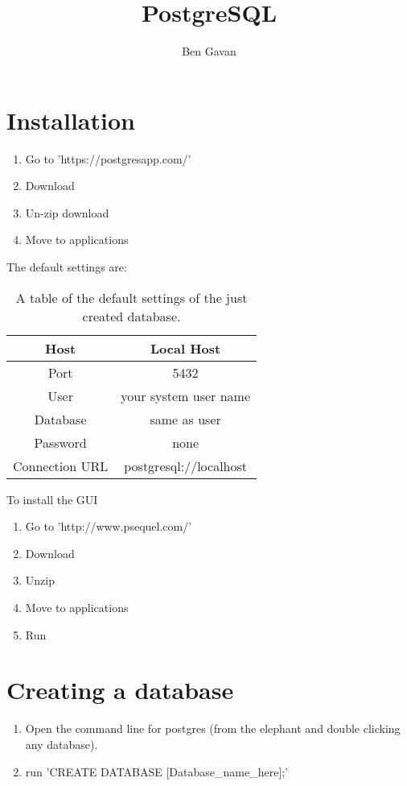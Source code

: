 \documentclass[]{article}
\title{PostgreSQL}
\author{Ben Gavan}
\begin{document}
\maketitle

\begin{abstract}

\end{abstract}

\tableofcontents

\section{Installation}
\begin{enumerate}
	\item Go to 'https://postgresapp.com/'
	\item Download
	\item Un-zip download 
	\item Move to applications
\end{enumerate}
The default settings are:
	\begin{center}
	\begin{table}[h!]
		\centering
		\begin{tabular}{|| c | c ||} 
			\hline
			Host & Local Host \\
			\hline
			Port & 5432 \\ 
			\hline
			User & your system user name \\
			\hline
			Database & same as user \\
			\hline
			Password & none \\
			\hline
			Connection URL & postgresql://localhost \\
			\hline
		\end{tabular}
		\label{tab:sucrose-variables}
		\caption{A table of the default settings of the just created database.}
	\end{table}
\end{center}
To install the GUI
\begin{enumerate}
	\item Go to 'http://www.psequel.com/'
	\item Download
	\item Unzip
	\item Move to applications
	\item Run
\end{enumerate}

\section{Creating a database}
\begin{enumerate}
	\item Open the command line for postgres (from the elephant and double clicking any database).
	\item run 'CREATE DATABASE [Database\_name\_here];'
\end{enumerate}
\end{document}
